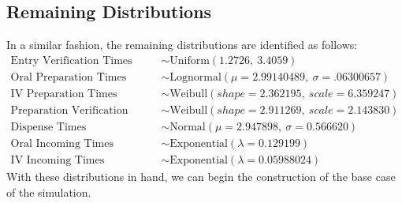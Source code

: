 \documentclass[10pt]{report}            %
\begin{document}
\subsection*{Remaining Distributions}
In a similar fashion, the remaining distributions are identified as follows:
\begin{align*} 
\text{Entry Verification Times} &\sim \text{Uniform}(1.2726,\ 3.4059)\\
\text{Oral Preparation Times} &\sim \text{Lognormal}(\mu=2.99140489,\ \sigma=.06300657)\\
\text{IV Preparation Times} &\sim \text{Weibull}(shape=2.362195,\ scale=6.359247)\\
\text{Preparation Verification Times} &\sim \text{Weibull}(shape=2.911269,\ scale=2.143830)\\
\text{Dispense Times} &\sim \text{Normal}(\mu=2.947898,\ \sigma=0.566620)\\
\text{Oral Incoming Times} &\sim \text{Exponential}(\lambda = 0.129199 )\\
\text{IV Incoming Times} &\sim \text{Exponential}(\lambda = 0.05988024 )
\end{align*}
With these distributions in hand, we can begin the construction of the base case of the simulation.
\end{document}
